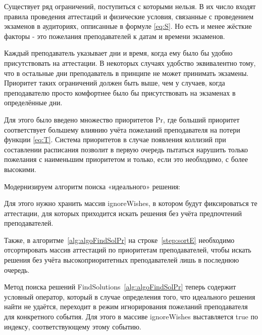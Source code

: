 Существует ряд ограничений, поступиться с которыми нельзя. В их число входят правила проведения аттестаций и физические условия, связанные с проведением экзаменов в аудиториях, опписанные в формуле \eqref{eq:S}. Но есть и менее жёсткие факторы - это пожелания преподавателей к датам и времени экзаменов. 

Каждый преподаватель указывает дни и время, когда ему было бы удобно присутствовать на аттестации. В некоторых случаях удобство эквивалентно тому, что в остальные дни преподаватель в принципе не может принимать экзамены. Приоритет таких ограничений должен быть выше, чем у случаев, когда преподавателю просто комфортнее было бы присутствовать на экзаменах в определённые дни.

Для этого было введено множество приоритетов Pr, где больший приоритет соответствует большему влиянию учёта пожеланий преподавателя на потери функции \eqref{eq:T}. Система приоритетов в случае появления коллизий при составлении расписания позволит в первую очередь пытаться нарушить только пожелания с наименьшим приоритетом и только, если это необходимо, с более высокими.

Модернизируем алгоритм поиска «идеального» решения:

Для этого нужно хранить массив ignoreWishes, в котором будут фиксироваться те аттестации, для которых приходится искать решения без учёта предпочтений преподавателей.

Также, в алгоритме~\ref{alg:algoFindSolPr} на строке~\ref{step:sortE} необходимо отсортировать массив аттестаций по приоритетам преподавателей, чтобы искать решения без учёта высокоприоритетных преподавателей лишь в последнюю очередь. 

Метод поиска решений FindSolutions~\ref{alg:algoFindSolPr} теперь содержит условный оператор, который в случае определения того, что идеального решения найти не удаётся, переходит в режим игнорирования пожеланий преподавателя для конкретного события. Для этого в массиве ignoreWishes выставляется true по индексу, соответствующему этому событию.

